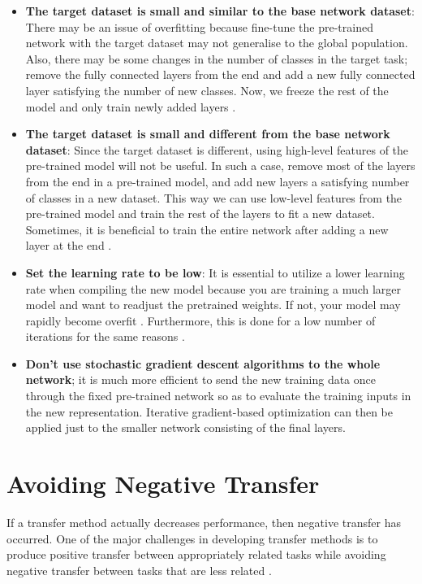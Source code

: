 \documentclass[11pt]{article}
\begin{document}
\begin{itemize}
    \item \textbf{The target dataset is small and similar to the base network dataset}: There may be an issue of overfitting because fine-tune the pre-trained network with the target dataset may not generalise to the global population. Also, there may be some changes in the number of classes in the target task; remove the fully connected layers from the end and add a new fully connected layer satisfying the number of new classes. Now, we freeze the rest of the model and only train newly added layers \cite{geeks-transfer-learning}.
    \item \textbf{The target dataset is small and different from the base network dataset}: Since the target dataset is different, using high-level features of the pre-trained model will not be useful. In such a case, remove most of the layers from the end in a pre-trained model, and add new layers a satisfying number of classes in a new dataset. This way we can use low-level features from the pre-trained model and train the rest of the layers to fit a new dataset. Sometimes, it is beneficial to train the entire network after adding a new layer at the end \cite{geeks-transfer-learning}.
    \item \textbf{Set the learning rate to be low}: It is essential to utilize a lower learning rate when compiling the new model because you are training a much larger model and want to readjust the pretrained weights. If not, your model may rapidly become overfit \cite{geeks-transfer-learning}. Furthermore, this is done for a low number of iterations for the same reasons \cite{deep-learning-book}.
    \item \textbf{Don't use stochastic gradient descent algorithms to the whole network}; it is much more efficient to send the new training data once through the fixed pre-trained network so as to evaluate the training inputs in the new representation. Iterative gradient-based optimization can then be applied just to the smaller network consisting of the final     layers.
\end{itemize}

\section{Avoiding Negative Transfer}

If a transfer method actually decreases performance, then negative transfer has occurred. One of the major challenges in developing transfer methods is to produce positive transfer between appropriately related tasks while avoiding negative transfer between tasks that are less related \cite{torrey-handbook}.
\end{document}
